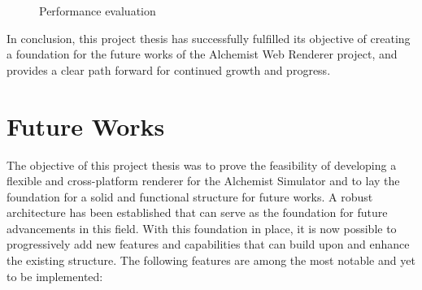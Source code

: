 \begin{center}
\begin{figure}[htb]
\begin{subfigure}[t]{0.45\textwidth}
		\end{subfigure}
		\caption{Performance evaluation}
		\label{fig:performace-graphs}
	\end{figure}
\end{center}

In conclusion, this project thesis has successfully fulfilled its objective of creating a foundation for the future works of the Alchemist Web Renderer project, and provides a clear path forward for continued growth and progress.\newline

\section{Future Works}
\label{sec:future-works}
The objective of this project thesis was to prove the feasibility of developing a flexible and cross-platform renderer for the Alchemist Simulator and to lay the foundation for a solid and functional structure for future works. A robust architecture has been established that can serve as the foundation for future advancements in this field. With this foundation in place, it is now possible to progressively add new features and capabilities that can build upon and enhance the existing structure. The following features are among the most notable and yet to be implemented:
